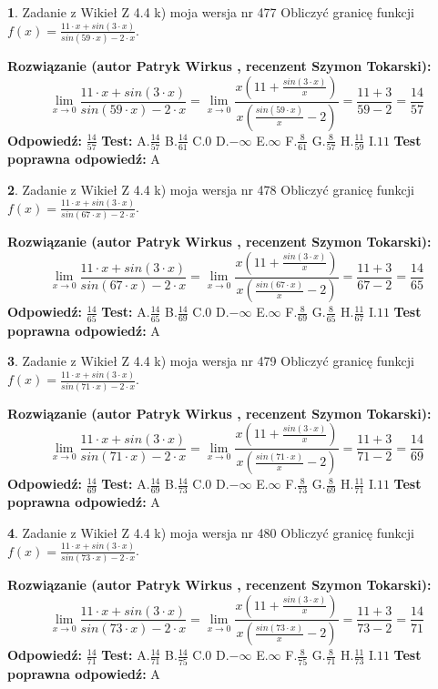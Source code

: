 \documentclass[12pt, a4paper]{article}
\theoremstyle{definition} %
\newtheorem{zad}{}
\newcommand{\zadStart}[1]{\begin{zad}#1\newline}
\newcommand{\zadStop}{\end{zad}}
\newcommand{\rozwStart}[2]{\noindent \textbf{Rozwiązanie (autor #1 , recenzent #2): }\newline}
\newcommand{\rozwStop}{\newline}
\newcommand{\odpStart}{\noindent \textbf{Odpowiedź:}\newline}
\newcommand{\odpStop}{\newline}
\newcommand{\testStart}{\noindent \textbf{Test:}\newline}
\newcommand{\testStop}{\newline}
\newcommand{\kluczStart}{\noindent \textbf{Test poprawna odpowiedź:}\newline}
\newcommand{\kluczStop}{\newline}
\begin{document}
\zadStart{Zadanie z Wikieł Z 4.4 k) moja wersja nr 477}
Obliczyć granicę funkcji $f(x)=\frac{11\cdot x +sin(3\cdot x)}{sin(59\cdot x) -2\cdot x}$.
\zadStop
\rozwStart{Patryk Wirkus}{Szymon Tokarski}
$$\lim\limits_{x\to 0}\frac{11\cdot x +sin(3\cdot x)}{sin(59\cdot x) -2\cdot x}
=\lim\limits_{x\to 0}\frac{x(11+\frac{sin(3\cdot x)}{x})}{x(\frac{sin(59\cdot x)}{x}-2)}
=\frac{11+3}{59-2} = \frac{14}{57}$$
\rozwStop
\odpStart
$\frac{14}{57}$
\odpStop
\testStart
A.$\frac{14}{57}$
B.$\frac{14}{61}$
C.$0$
D.$-\infty$
E.$\infty$
F.$\frac{8}{61}$
G.$\frac{8}{57}$
H.$\frac{11}{59}$
I.$11$
\testStop
\kluczStart
A
\kluczStop



\zadStart{Zadanie z Wikieł Z 4.4 k) moja wersja nr 478}
Obliczyć granicę funkcji $f(x)=\frac{11\cdot x +sin(3\cdot x)}{sin(67\cdot x) -2\cdot x}$.
\zadStop
\rozwStart{Patryk Wirkus}{Szymon Tokarski}
$$\lim\limits_{x\to 0}\frac{11\cdot x +sin(3\cdot x)}{sin(67\cdot x) -2\cdot x}
=\lim\limits_{x\to 0}\frac{x(11+\frac{sin(3\cdot x)}{x})}{x(\frac{sin(67\cdot x)}{x}-2)}
=\frac{11+3}{67-2} = \frac{14}{65}$$
\rozwStop
\odpStart
$\frac{14}{65}$
\odpStop
\testStart
A.$\frac{14}{65}$
B.$\frac{14}{69}$
C.$0$
D.$-\infty$
E.$\infty$
F.$\frac{8}{69}$
G.$\frac{8}{65}$
H.$\frac{11}{67}$
I.$11$
\testStop
\kluczStart
A
\kluczStop



\zadStart{Zadanie z Wikieł Z 4.4 k) moja wersja nr 479}
Obliczyć granicę funkcji $f(x)=\frac{11\cdot x +sin(3\cdot x)}{sin(71\cdot x) -2\cdot x}$.
\zadStop
\rozwStart{Patryk Wirkus}{Szymon Tokarski}
$$\lim\limits_{x\to 0}\frac{11\cdot x +sin(3\cdot x)}{sin(71\cdot x) -2\cdot x}
=\lim\limits_{x\to 0}\frac{x(11+\frac{sin(3\cdot x)}{x})}{x(\frac{sin(71\cdot x)}{x}-2)}
=\frac{11+3}{71-2} = \frac{14}{69}$$
\rozwStop
\odpStart
$\frac{14}{69}$
\odpStop
\testStart
A.$\frac{14}{69}$
B.$\frac{14}{73}$
C.$0$
D.$-\infty$
E.$\infty$
F.$\frac{8}{73}$
G.$\frac{8}{69}$
H.$\frac{11}{71}$
I.$11$
\testStop
\kluczStart
A
\kluczStop



\zadStart{Zadanie z Wikieł Z 4.4 k) moja wersja nr 480}
Obliczyć granicę funkcji $f(x)=\frac{11\cdot x +sin(3\cdot x)}{sin(73\cdot x) -2\cdot x}$.
\zadStop
\rozwStart{Patryk Wirkus}{Szymon Tokarski}
$$\lim\limits_{x\to 0}\frac{11\cdot x +sin(3\cdot x)}{sin(73\cdot x) -2\cdot x}
=\lim\limits_{x\to 0}\frac{x(11+\frac{sin(3\cdot x)}{x})}{x(\frac{sin(73\cdot x)}{x}-2)}
=\frac{11+3}{73-2} = \frac{14}{71}$$
\rozwStop
\odpStart
$\frac{14}{71}$
\odpStop
\testStart
A.$\frac{14}{71}$
B.$\frac{14}{75}$
C.$0$
D.$-\infty$
E.$\infty$
F.$\frac{8}{75}$
G.$\frac{8}{71}$
H.$\frac{11}{73}$
I.$11$
\testStop
\kluczStart
A
\kluczStop
\end{document}
